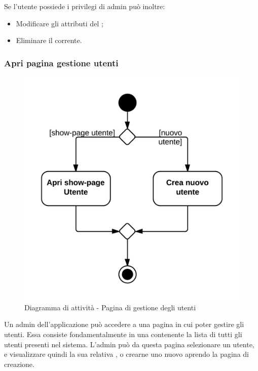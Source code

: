 Se l'utente possiede i privilegi di admin può inoltre:

\begin{itemize}

	\item Modificare gli attributi del ;
	\item Eliminare il  corrente.

\end{itemize}

\subsubsection{Apri pagina gestione utenti}

\begin{figure}[H]
\centering
\includegraphics[scale=0.1]{uml/attivita/MaaP - Apri pagina gestione utenti.png}
\caption{Diagramma di attività - Pagina di gestione degli utenti}
\end{figure}

Un admin dell'applicazione può accedere a una pagina in cui poter gestire gli utenti. Essa consiste fondamentalmente in una  contenente la lista di tutti gli utenti presenti nel sistema. L'admin può da questa pagina selezionare un utente, e visualizzare quindi la sua relativa , o crearne uno nuovo aprendo la pagina di creazione.

